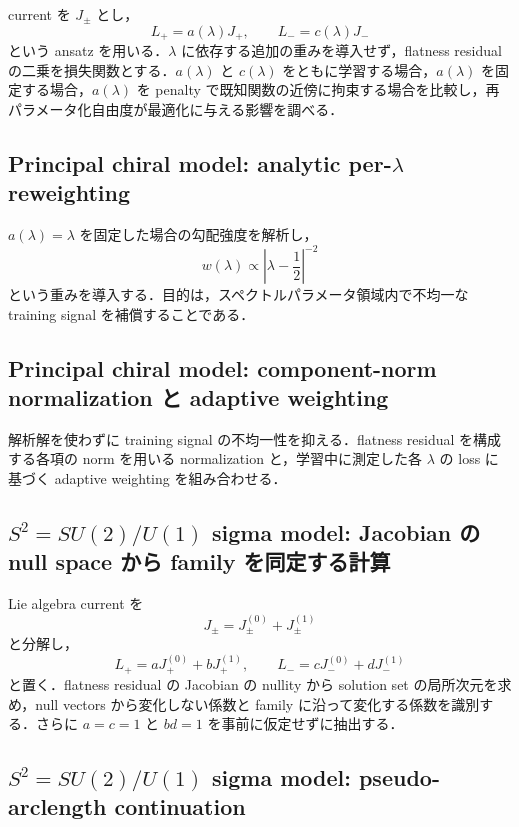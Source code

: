 \documentclass[11pt,a4paper]{ltjsarticle}
\begin{document}
current を $J_\pm$ とし，
\begin{equation}
L_+=a(\lambda)J_+,
\qquad
L_-=c(\lambda)J_-
\end{equation}
という ansatz を用いる．$\lambda$ に依存する追加の重みを導入せず，flatness residual の二乗を損失関数とする．$a(\lambda)$ と $c(\lambda)$ をともに学習する場合，$a(\lambda)$ を固定する場合，$a(\lambda)$ を penalty で既知関数の近傍に拘束する場合を比較し，再パラメータ化自由度が最適化に与える影響を調べる．

\subsection{Principal chiral model: analytic per-$\lambda$ reweighting}

$a(\lambda)=\lambda$ を固定した場合の勾配強度を解析し，
\begin{equation}
w(\lambda)\propto\left|\lambda-\frac12\right|^{-2}
\end{equation}
という重みを導入する．目的は，スペクトルパラメータ領域内で不均一な training signal を補償することである．

\subsection{Principal chiral model: component-norm normalization と adaptive weighting}

解析解を使わずに training signal の不均一性を抑える．flatness residual を構成する各項の norm を用いる normalization と，学習中に測定した各 $\lambda$ の loss に基づく adaptive weighting を組み合わせる．

\subsection{$S^2=SU(2)/U(1)$ sigma model: Jacobian の null space から family を同定する計算}

Lie algebra current を
\begin{equation}
J_\pm=J_\pm^{(0)}+J_\pm^{(1)}
\end{equation}
と分解し，
\begin{equation}
L_+=aJ_+^{(0)}+bJ_+^{(1)},
\qquad
L_-=cJ_-^{(0)}+dJ_-^{(1)}
\end{equation}
と置く．flatness residual の Jacobian の nullity から solution set の局所次元を求め，null vectors から変化しない係数と family に沿って変化する係数を識別する．さらに $a=c=1$ と $bd=1$ を事前に仮定せずに抽出する．

\subsection{$S^2=SU(2)/U(1)$ sigma model: pseudo-arclength continuation}
\end{document}
